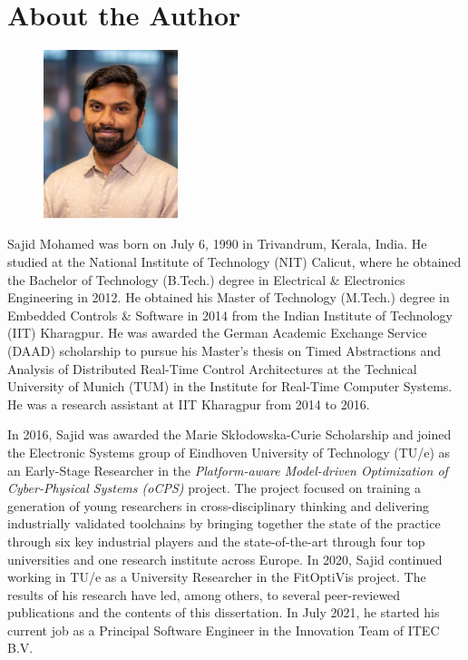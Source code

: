 \chapter{About the Author}
\pagestyle{empty}
\begin{figure}
\centering
\includegraphics[width=0.35\textwidth]{Figures/sajid.jpg}
\end{figure}

Sajid Mohamed was born on July 6, 1990 in Trivandrum, Kerala, India. 
He studied at the National Institute of Technology (NIT) Calicut, where he obtained the Bachelor of Technology (B.Tech.) degree in Electrical \& Electronics Engineering in 2012.
He obtained his Master of Technology (M.Tech.) degree in Embedded Controls \& Software in 2014 from the Indian Institute of Technology (IIT) Kharagpur.
He was awarded the German Academic Exchange Service (DAAD) scholarship to pursue his Master's thesis
on Timed Abstractions and Analysis of Distributed Real-Time Control Architectures
at the Technical University of Munich (TUM) in the Institute for Real-Time Computer Systems.
He was a research assistant at IIT Kharagpur from 2014 to 2016.

In 2016, Sajid was awarded the Marie Skłodowska-Curie Scholarship and joined the Electronic Systems group of Eindhoven University of Technology (TU/e) as an Early-Stage Researcher in the \emph{Platform-aware Model-driven Optimization of Cyber-Physical Systems (oCPS)} project.
The project focused on training a generation of young researchers in cross-disciplinary thinking and delivering industrially validated toolchains by bringing together the state of the practice through six key industrial players and the state-of-the-art through four top universities and one research institute across Europe.
In 2020, Sajid continued working in TU/e as a University Researcher in the FitOptiVis project.
The results of his research have led, among others, to several peer-reviewed publications and the contents of this dissertation.
In July 2021, he started his current job as a Principal Software Engineer in the Innovation Team of ITEC B.V.
